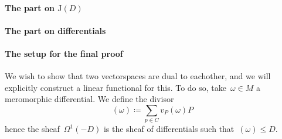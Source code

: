 \documentclass[10pt,a4paper]{article}
\theoremstyle{lecture}
\begin{document}
\paragraph{The part on $\mathrm{J}(D)$}

\paragraph{The part on differentials}

\paragraph{The setup for the final proof}
We wish to show that two vectorspaces are dual to eachother, and we will explicitly construct a linear functional for this. To do so, take~$\omega\in M$ a meromorphic differential. We define the divisor
\begin{equation}
  (\omega)\coloneqq\sum_{p\in C}v_P(\omega)P
\end{equation}
hence the sheaf~$\Omega^1(-D)$ is the sheaf of differentials such that~$(\omega)\leq D$.
\end{document}
